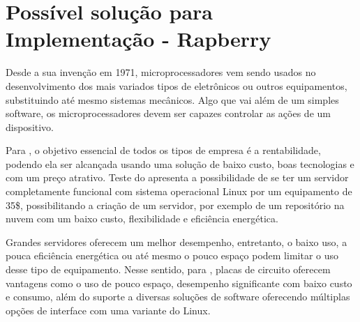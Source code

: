 
\section{Possível solução para Implementação - Rapberry}
Desde a sua invenção em 1971, microprocessadores vem sendo usados no desenvolvimento dos mais variados tipos de eletrônicos ou outros equipamentos, substituindo até mesmo sistemas mecânicos. Algo que vai além de um simples software, os microprocessadores devem ser capazes controlar as ações de um dispositivo. \cite{rosenstark2007}

Para \cite{aristotelous2016}, o objetivo essencial de todos os tipos de empresa é a rentabilidade, podendo ela ser alcançada usando uma solução de baixo custo, boas tecnologias e com um preço atrativo. Teste do \cite{aristotelous2016} apresenta a possibilidade de se ter um servidor completamente funcional com sistema operacional Linux por um equipamento de 35\$, possibilitando a criação de um servidor, por exemplo de um repositório na nuvem com um baixo custo, flexibilidade e eficiência energética. 

Grandes servidores oferecem um melhor desempenho, entretanto, o baixo uso, a pouca eficiência energética ou até mesmo o pouco espaço podem limitar o uso desse tipo de equipamento. Nesse sentido, para \cite{cusick2014}, placas de circuito oferecem vantagens como o uso de pouco espaço, desempenho significante com baixo custo e consumo, além do suporte a diversas soluções de software oferecendo múltiplas opções de interface com uma variante do Linux. 

